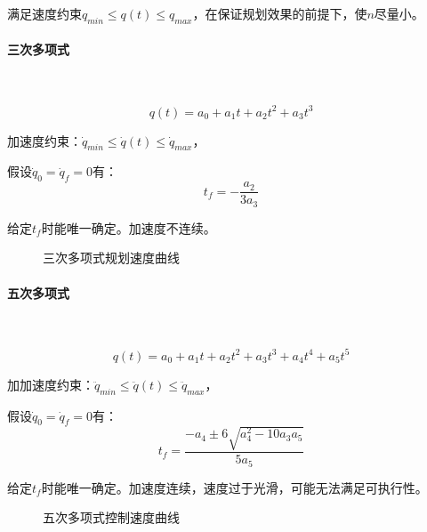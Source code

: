 \documentclass[
12pt, %
a4paper, 
oneside, %
]{scrartcl}
\begin{document}
满足速度约束$ q_{min} \leq q(t) \leq q_{max} $，在保证规划效果的前提下，使$ n $尽量小。
\paragraph{三次多项式}~\\
\begin{minipage}{0.6\textwidth}
$$ q(t) = a_0 + a_1 t + a_2 t^2 + a_3 t^3 $$

\hspace{2em}
加速度约束：$ \dot{q}_{min} \leq \dot{q}(t) \leq \dot{q}_{max} $，

\hspace{2em}
假设$ \dot{q}_0 = \dot{q}_f = 0 $有：
$$ t_f = -\frac{a_2}{3a_3} $$

\hspace{2em}
给定$ t_f $时能唯一确定。加速度不连续。
\end{minipage}
\begin{minipage}{0.4\textwidth}
\begin{figure}[H]
\centering
{}
\caption{三次多项式规划速度曲线}
\end{figure}
\end{minipage}
\paragraph{五次多项式}~\\
\begin{minipage}{0.6\textwidth}
$$ q(t) = a_0 + a_1 t + a_2 t^2 + a_3 t^3 + a_4 t^4 + a_5 t^5 $$

\hspace{2em}
加加速度约束：$ \ddot{q}_{min} \leq \ddot{q}(t) \leq \ddot{q}_{max} $，

\hspace{2em}
假设$ \dot{q}_0 = \dot{q}_f = 0 $有：
$$ t_f = \frac{-a_4 \pm 6 \sqrt{a_4^2 - 10 a_3 a_5}}{5a_5} $$ 

\hspace{2em}
给定$ t_f $时能唯一确定。加速度连续，速度过于光滑，可能无法满足可执行性。
\end{minipage}
\begin{minipage}{0.4\textwidth}
\begin{figure}[H]
\centering
{}
\caption{五次多项式控制速度曲线}
\end{figure}
\end{minipage}
\end{document}
